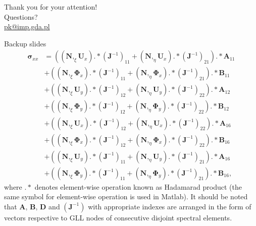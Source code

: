 \documentclass[10pt]{beamer} %
\renewcommand{\vec}[1]{\mathbf{#1}}
\newcommand{\bm}[1]{\mathbf{#1}}
\newcommand{\bs}[1]{\boldsymbol{#1}}
\begin{document}
{
\begin{frame}[standout]
  Thank you for your attention!\\ \vspace{12pt}
  Questions?\\ \vspace{12pt}
  \url{pk@imp.gda.pl}
\end{frame}
}
\appendix
\begin{frame}{Backup slides}
  \begin{equation*}
  \begin{split}
  \bs{\sigma}_{xx}&=\left((\bm{N},_{\xi}\vec{U}_x).*(\vec{J}^{-1})_{11}+(\bm{N},_{\eta}\vec{U}_x).*(\vec{J}^{-1})_{21}\right).*\vec{A}_{11}\\
  &+\left((\bm{N},_{\xi}\bs{\Phi}_x).*(\vec{J}^{-1})_{11}+(\bm{N},_{\eta}\bs{\Phi}_x).*(\vec{J}^{-1})_{21}\right).*\vec{B}_{11}\\
  &+\left((\bm{N},_{\xi}\vec{U}_y).*(\vec{J}^{-1})_{12}+(\bm{N},_{\eta}\vec{U}_y).*(\vec{J}^{-1})_{22}\right).*\vec{A}_{12}\\
  &+\left((\bm{N},_{\xi}\bs{\Phi}_y).*(\vec{J}^{-1})_{12}+(\bm{N},_{\eta}\bs{\Phi}_y).*(\vec{J}^{-1})_{22}\right).*\vec{B}_{12}\\
  &+\left((\bm{N},_{\xi}\vec{U}_x).*(\vec{J}^{-1})_{12}+(\bm{N},_{\eta}\vec{U}_x).*(\vec{J}^{-1})_{22}\right).*\vec{A}_{16}\\
  &+\left((\bm{N},_{\xi}\bs{\Phi}_x).*(\vec{J}^{-1})_{12}+(\bm{N},_{\eta}\bs{\Phi}_x).*(\vec{J}^{-1})_{22}\right).*\vec{B}_{16}\\
  &+\left((\bm{N},_{\xi}\vec{U}_y).*(\vec{J}^{-1})_{11}+(\bm{N},_{\eta}\vec{U}_y).*(\vec{J}^{-1})_{21}\right).*\vec{A}_{16}\\
  &+\left((\bm{N},_{\xi}\bs{\Phi}_y).*(\vec{J}^{-1})_{11}+(\bm{N},_{\eta}\bs{\Phi}_y).*(\vec{J}^{-1})_{21}\right).*\vec{B}_{16},
  \end{split}
  \end{equation*}
  where $.*$ denotes element-wise operation known as Hadamarad product (the same symbol for element-wise operation is used in Matlab). It should be noted that $\vec{A}$, $\vec{B}$, $\vec{D}$ and $(\vec{J}^{-1})$ with appropriate indexes are arranged in the form of vectors respective to GLL nodes of consecutive disjoint spectral elements.
\end{frame}
\end{document}
